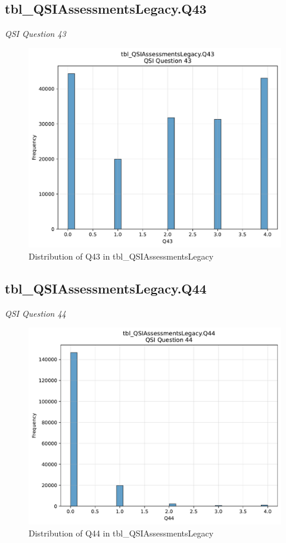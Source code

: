 \subsection{tbl\_QSIAssessmentsLegacy.Q43}
\textit{QSI Question 43}

\begin{figure}[htbp]
\centering
\includegraphics[width=\textwidth]{figures/dbo_tbl_QSIAssessmentsLegacy_Q43.pdf}
\caption{Distribution of Q43 in tbl\_QSIAssessmentsLegacy}
\end{figure}\newpage

\subsection{tbl\_QSIAssessmentsLegacy.Q44}
\textit{QSI Question 44}

\begin{figure}[htbp]
\centering
\includegraphics[width=\textwidth]{figures/dbo_tbl_QSIAssessmentsLegacy_Q44.pdf}
\caption{Distribution of Q44 in tbl\_QSIAssessmentsLegacy}
\end{figure}\newpage

